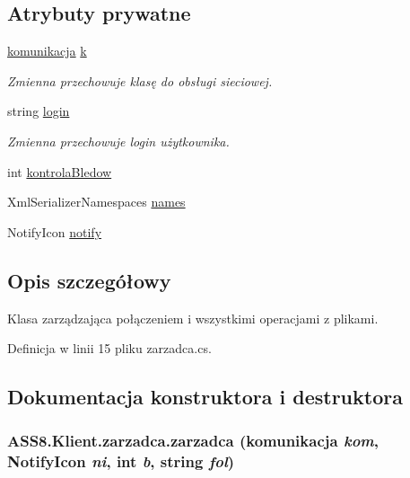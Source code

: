 \subsection*{Atrybuty prywatne}
\begin{CompactItemize}
\item 
\hyperlink{a00013}{komunikacja} \hyperlink{a00037_b7fef33c2cf29406276fbbb926338c96}{k}
\begin{CompactList}\small\item\em Zmienna przechowuje klasę do obsługi sieciowej. \item\end{CompactList}\item 
string \hyperlink{a00037_064dde1d0807e0df79bbf7b697878583}{login}
\begin{CompactList}\small\item\em Zmienna przechowuje login użytkownika. \item\end{CompactList}\item 
int \hyperlink{a00037_3d392ffd05da1da4971c8f2629be04eb}{kontrolaBledow}
\item 
XmlSerializerNamespaces \hyperlink{a00037_ade6b1a7122cb3a1f7d719376694dd0e}{names}
\item 
NotifyIcon \hyperlink{a00037_7c6e834f62b4eb8c8138b736497c9a56}{notify}
\end{CompactItemize}


\subsection{Opis szczegółowy}
Klasa zarządzająca połączeniem i wszystkimi operacjami z plikami. 



Definicja w linii 15 pliku zarzadca.cs.

\subsection{Dokumentacja konstruktora i destruktora}
\hypertarget{a00037_fefaf155f21b7d7cafd855f1c3fdb21d}{
\subsubsection[{zarzadca}]{\setlength{\rightskip}{0pt plus 5cm}ASS8.Klient.zarzadca.zarzadca ({\bf komunikacja} {\em kom}, \/  NotifyIcon {\em ni}, \/  int {\em b}, \/  string {\em fol})}}
\label{d1/dc6/a00037_fefaf155f21b7d7cafd855f1c3fdb21d}


